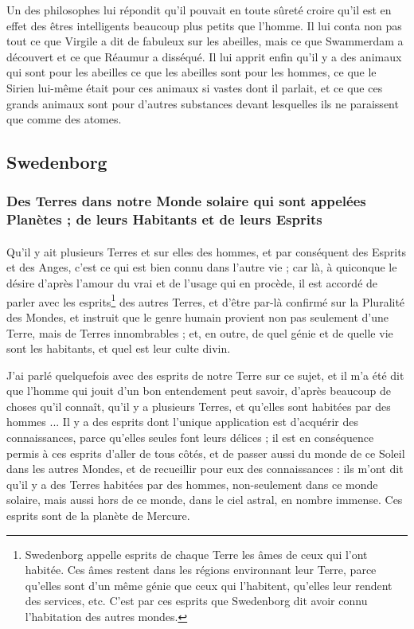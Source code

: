 \documentclass[a4paper, 11pt, oneside]{article}
\begin{document}
Un des philosophes lui répondit qu'il pouvait en toute sûreté croire qu'il est en effet des êtres intelligents beaucoup plus petits que l'homme. Il lui conta non pas tout ce que Virgile a dit de fabuleux sur les abeilles, mais ce que Swammerdam a découvert et ce que Réaumur a disséqué. Il lui apprit enfin qu'il y a des animaux qui sont pour les abeilles ce que les abeilles sont pour les hommes, ce que le Sirien lui-même était pour ces animaux si vastes dont il parlait, et ce que ces grands animaux sont pour d'autres substances devant lesquelles ils ne paraissent que comme des atomes.
\clearpage
\subsection{Swedenborg}
\subsubsection{Des Terres dans notre Monde solaire qui sont appelées Planètes ; de leurs Habitants et de leurs Esprits}
\paragraph{}
Qu'il y ait plusieurs Terres et sur elles des hommes, et par conséquent des Esprits et des Anges, c'est ce qui est bien connu dans l'autre vie ; car là, à quiconque le désire d'après l'amour du vrai et de l'usage qui en procède, il est accordé de parler avec les esprits\footnote{Swedenborg appelle esprits de chaque Terre les âmes de ceux qui l'ont habitée. Ces âmes restent dans les régions environnant leur Terre, parce qu'elles sont d'un même génie que ceux qui l'habitent, qu'elles leur rendent des services, etc. C'est par ces esprits que Swedenborg dit avoir connu l'habitation des autres mondes.} des autres Terres, et d'être par-là confirmé sur la Pluralité des Mondes, et instruit que le genre humain provient non pas seulement d'une Terre, mais de Terres innombrables ; et, en outre, de quel génie et de quelle vie sont les habitants, et quel est leur culte divin.

J'ai parlé quelquefois avec des esprits de notre Terre sur ce sujet, et il m'a été dit que l'homme qui jouit d'un bon entendement peut savoir, d'après beaucoup de choses qu'il connaît, qu'il y a plusieurs Terres, et qu'elles sont habitées par des hommes ... Il y a des esprits dont l'unique application est d'acquérir des connaissances, parce qu'elles seules font leurs délices ; il est en conséquence permis à ces esprits d'aller de tous côtés, et de passer aussi du monde de ce Soleil dans les autres Mondes, et de recueillir pour eux des connaissances : ils m'ont dit qu'il y a des Terres habitées par des hommes, non-seulement dans ce monde solaire, mais aussi hors de ce monde, dans le ciel astral, en nombre immense. Ces esprits sont de la planète de Mercure.
\end{document}
